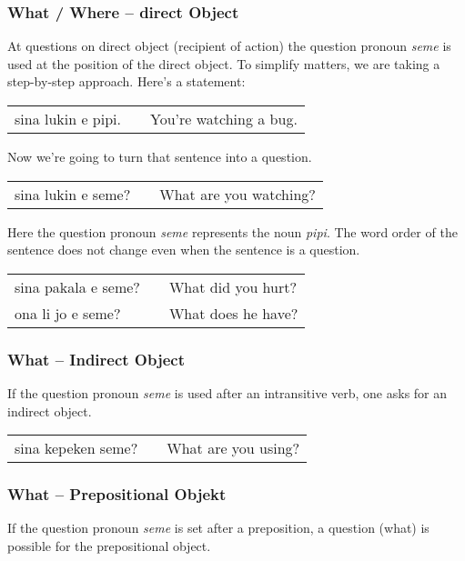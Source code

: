 \subsubsection*{What / Where -- direct Object}
%
At questions on direct object (recipient of action) the question pronoun \textit{seme} is used at the position of the direct object.
To simplify matters, we are taking a step-by-step approach.
Here's a statement:

\begin{supertabular}{p{5,5cm}|ll}
sina lukin e pipi. && You're watching a bug. \\
\end{supertabular} 

Now we're going to turn that sentence into a question. 

\begin{supertabular}{p{5,5cm}|ll}
sina lukin e seme? && What are you watching? \\
\end{supertabular} 

Here the question pronoun \textit{seme} represents the noun \textit{pipi}. 
The word order of the sentence does not change even when the sentence is a question. 

\begin{supertabular}{p{5,5cm}|ll}
sina pakala e seme? && What did you hurt? \\
ona li jo e seme? && What does he have? \\
\end{supertabular} 
%
\subsubsection*{What -- Indirect Object}

If the question pronoun \textit{seme} is used after an intransitive verb, one asks for an indirect object. 

\begin{supertabular}{p{5,5cm}|ll}
sina kepeken seme? && What are you using? \\
\end{supertabular} 
%
\newpage
\subsubsection*{What -- Prepositional Objekt}
%
If the question pronoun \textit{seme} is set after a preposition, a question (what) is possible for the prepositional object. \\

